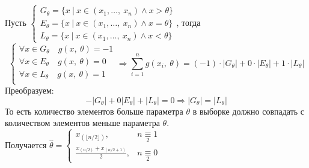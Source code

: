 \documentclass[12pt, a4paper]{article}
\begin{document}
Пусть $\begin{cases}

        G_{\theta} = \{x\ |\ x\in (x_1,\dots,\ x_n) \wedge x > \theta\} \\ E_{\theta} =
        \{x\ |\ x\in (x_1,\dots,\ x_n) \wedge x = \theta\}              \\ L_{\theta} = \{x\ |\ x\in
        (x_1,\dots,\ x_n) \wedge x < \theta\}
    \end{cases}$, тогда
\[\begin{cases}
        \forall x\in G_{\theta}\quad g(x,\ \theta) = -1 \\
        \forall x\in E_{\theta}\quad g(x,\ \theta) = 0  \\
        \forall x\in L_{\theta}\quad g(x,\ \theta) = 1  \\
    \end{cases}\Rightarrow \sum_{i = 1}^{n} g(x_i,\ \theta) = (-1)\cdot|G_{\theta}| + 0\cdot|E_{\theta}| + 1\cdot |L_{\theta}|\]
Преобразуем:
\begin{equation*}
    -|G_{\theta}| + 0|E_{\theta}| + |L_{\theta}| = 0\Rightarrow |G_{\theta}| = |L_{\theta}|
\end{equation*}
То есть количество элементов больше параметра $\theta$ в выборке должно совпадать с количеством элементов меньше параметра $\theta$.\\

Получается $\hat \theta = \begin{cases}
        x_{(\lfloor n/2 \rfloor)},           & n\underset{2}{\equiv} 1 \\
        \frac{x_{(n/2)} + x_{(n/2 + 1)}}{2}, & n\underset{2}{\equiv} 0
    \end{cases}$
\end{document}
